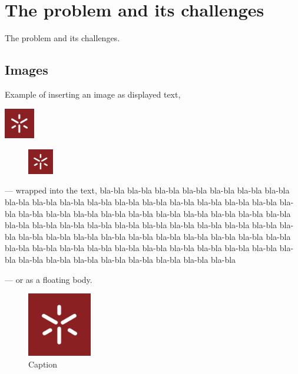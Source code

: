 \chapter{The problem and its challenges}

The problem and its challenges.

\section{Images}
Example of inserting an image as displayed text,
\begin{center}
	\includegraphics[width=0.1\textwidth]{images/UM.jpg}
\end{center}

\begin{figure}	
	\includegraphics[width=0.1\textwidth]{images/UM.jpg}
\end{figure}
\noindent --- wrapped into the text,
bla-bla bla-bla bla-bla bla-bla bla-bla bla-bla bla-bla bla-bla bla-bla bla-bla
bla-bla bla-bla bla-bla bla-bla bla-bla bla-bla bla-bla bla-bla bla-bla bla-bla
bla-bla bla-bla bla-bla bla-bla bla-bla bla-bla bla-bla bla-bla bla-bla bla-bla
bla-bla bla-bla bla-bla bla-bla bla-bla bla-bla bla-bla bla-bla bla-bla bla-bla
bla-bla bla-bla bla-bla bla-bla bla-bla bla-bla bla-bla bla-bla bla-bla bla-bla bla-bla bla-bla bla-bla bla-bla
bla-bla bla-bla bla-bla bla-bla bla-bla bla-bla bla-bla bla-bla bla-bla bla-bla bla-bla bla-bla bla-bla bla-bla

\noindent --- or as a floating body.
\begin{figure}
\begin{center}
	\includegraphics[width=0.25\textwidth]{images/UM.jpg}
\end{center}
\caption{Caption}
\end{figure}


